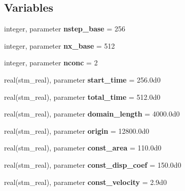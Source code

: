 \subsection*{Variables}
\begin{CompactItemize}
\item 
\hypertarget{a00073_d1b2a2bf58f522e774cc11871bb03d90}{
integer, parameter \textbf{nstep\_\-base} = 256}
\label{a00073_d1b2a2bf58f522e774cc11871bb03d90}

\item 
\hypertarget{a00073_8f55345372816b9ee5baa3dde5c05636}{
integer, parameter \textbf{nx\_\-base} = 512}
\label{a00073_8f55345372816b9ee5baa3dde5c05636}

\item 
\hypertarget{a00073_eae24c99ed489fd4cb3700b329504710}{
integer, parameter \textbf{nconc} = 2}
\label{a00073_eae24c99ed489fd4cb3700b329504710}

\item 
\hypertarget{a00073_c61aca11953a2bf32befd80b2f30a476}{
real(stm\_\-real), parameter \textbf{start\_\-time} = 256.0d0}
\label{a00073_c61aca11953a2bf32befd80b2f30a476}

\item 
\hypertarget{a00073_7ae0c3b6aa3d87d9a759927939763639}{
real(stm\_\-real), parameter \textbf{total\_\-time} = 512.0d0}
\label{a00073_7ae0c3b6aa3d87d9a759927939763639}

\item 
\hypertarget{a00073_b067857f8e786a7c42fdd647b9041463}{
real(stm\_\-real), parameter \textbf{domain\_\-length} = 4000.0d0}
\label{a00073_b067857f8e786a7c42fdd647b9041463}

\item 
\hypertarget{a00073_b4329bc9a269ab7453454a92ef427c01}{
real(stm\_\-real), parameter \textbf{origin} = 12800.0d0}
\label{a00073_b4329bc9a269ab7453454a92ef427c01}

\item 
\hypertarget{a00073_a0a389a8af065baca773c3e98e3d91af}{
real(stm\_\-real), parameter \textbf{const\_\-area} = 110.0d0}
\label{a00073_a0a389a8af065baca773c3e98e3d91af}

\item 
\hypertarget{a00073_1e5fbc940d08436d4597188500d6ab58}{
real(stm\_\-real), parameter \textbf{const\_\-disp\_\-coef} = 150.0d0}
\label{a00073_1e5fbc940d08436d4597188500d6ab58}

\item 
\hypertarget{a00073_929635b459204795af96df2484316cf7}{
real(stm\_\-real), parameter \textbf{const\_\-velocity} = 2.9d0}
\label{a00073_929635b459204795af96df2484316cf7}


\end{CompactItemize}
